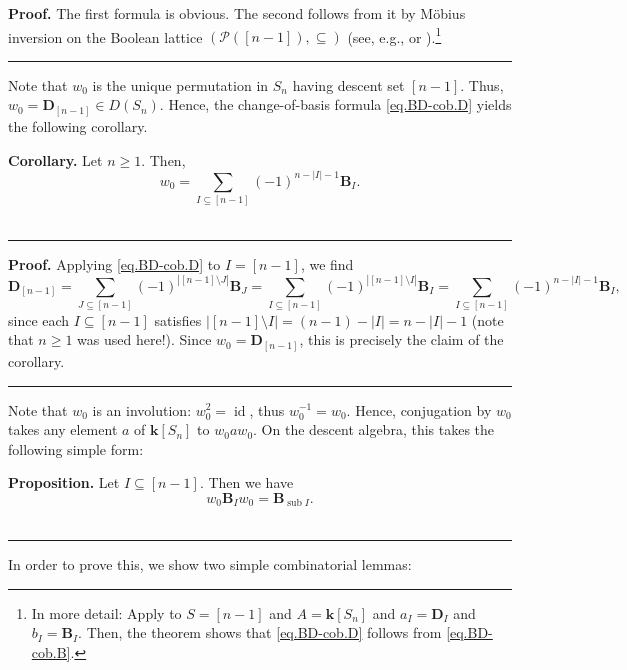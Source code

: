 \documentclass[12pt]{article}
\theoremstyle{definition}%
\newtheorem{prop}[thm]{Proposition}
\newtheorem{cor}[thm]{Corollary}
\theoremstyle{definition}%
\theoremstyle{remark}%
\newcommand{\tup}[1]{\left( #1 \right)}
\newcommand{\interval}[1]{\left[ #1 \right]} %
\newcommand{\card}[1]{\left| #1 \right|} %
\newcommand{\kk}{\mathbf{k}}
\newcommand{\ksn}{\kk\left[S_n\right]}
\newcommand{\dsn}{D\left(S_n\right)}
\newcommand{\BB}{\mathbf{B}}
\newcommand{\BBi}{\mathbf{B}_{I}}
\newcommand{\DD}{\mathbf{D}}
\newcommand{\wo}{w_0} %
\newcommand{\sub}{\operatorname{sub}}
\newcommand{\id}{\operatorname{id}}
\newenvironment{prop}[1][Proposition]{\noindent\textbf{#1.} }{\ \rule{0.5em}{0.5em}}
\newenvironment{cor}[1][Corollary]{\noindent\textbf{#1.} }{\ \rule{0.5em}{0.5em}}
\newenvironment{proof}[1][Proof]{\noindent\textbf{#1.} }{\ \rule{0.5em}{0.5em}}
\begin{document}
\begin{proof}
    The first formula is obvious.
	The second follows from it by M\"obius inversion on the Boolean lattice $\tup{\mathcal{P}\tup{\interval{n-1}},\subseteq}$ (see, e.g., \cite[Theorem 6.2.10]{21s} or \cite[the dual form of Theorem 2.1.1]{EC1}).\footnote{In more detail: Apply \cite[Theorem 6.2.10]{21s} to $S = \interval{n-1}$ and $A = \ksn$ and $a_I = \DD_I$ and $b_I = \BB_I$. Then, the theorem shows that \eqref{eq.BD-cob.D} follows from \eqref{eq.BD-cob.B}.}
\end{proof}

Note that $\wo$ is the unique permutation in $S_n$ having descent set $\interval{n-1}$.
Thus, $\wo = \DD_{\interval{n-1}} \in \dsn$.
Hence, the change-of-basis formula \eqref{eq.BD-cob.D} yields the following corollary.

\begin{cor}
   \label{w0_dsn_cor}
   Let $n \geq 1$. Then,
   \begin{equation}
       \wo = \sum_{I \subseteq \interval{n-1}} \tup{-1}^{n-\card{I}-1} \BB_{I}.
	   \label{eq.w0_dsn_cor.eq}
   \end{equation}
\end{cor}

\begin{proof}
Applying \eqref{eq.BD-cob.D} to $I = \interval{n-1}$, we find
\[
    \DD_{\interval{n-1}}
	= \sum_{J \subseteq \interval{n-1}} \tup{-1}^{\card{\interval{n-1}\setminus J}} \BB_J
	= \sum_{I \subseteq \interval{n-1}} \tup{-1}^{\card{\interval{n-1}\setminus I}} \BB_I
	= \sum_{I \subseteq \interval{n-1}} \tup{-1}^{n-\card{I}-1} \BB_{I},
\]
since each $I \subseteq \interval{n-1}$ satisfies
$\card{\interval{n-1}\setminus I} = \tup{n-1} - \card{I} = n-\card{I}-1$
(note that $n \geq 1$ was used here!).
Since $\wo = \DD_{\interval{n-1}}$, this is precisely the claim of the corollary.
\end{proof}

Note that $\wo$ is an involution: $\wo^2 = \id$, thus $\wo^{-1} = \wo$. Hence, conjugation by $\wo$ takes any element $a$ of $\ksn$ to $\wo a \wo$.
On the descent algebra, this takes the following simple form:

\begin{prop}
    \label{w0conj_prop}
    Let $I \subseteq \interval{n-1}$. Then we have
    \[
        \wo \BBi \wo = \BB_{\sub I}.
    \]
\end{prop}

In order to prove this, we show two simple combinatorial lemmas:
\end{document}
